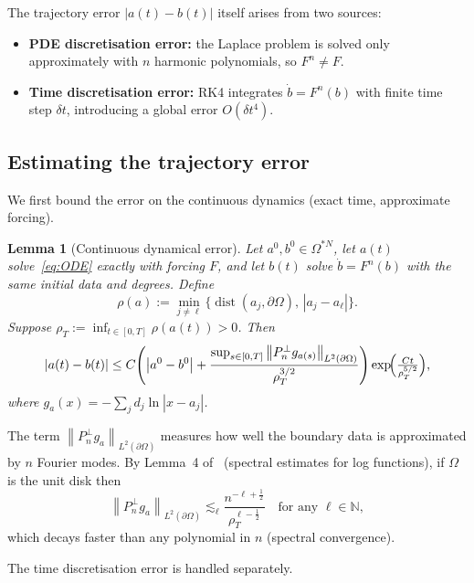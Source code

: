 \documentclass[12pt, a4paper]{article}
\theoremstyle{plain}
\newtheorem{lemma}[theorem]{Lemma}
\theoremstyle{definition}
\newcommand{\N}{\mathbb{N}}
\newcommand{\norm}[1]{\left\lVert #1 \right\rVert}
\newcommand{\abs}[1]{\left\lvert #1 \right\rvert}
\begin{document}
The trajectory error $\abs{a(t) - b(t)}$ itself arises from two sources:
\begin{itemize}
  \item \textbf{PDE discretisation error:} the Laplace problem is solved
        only approximately with $n$ harmonic polynomials, so $F^n \ne F$.
  \item \textbf{Time discretisation error:} RK4 integrates $\dot b = F^n(b)$
        with finite time step $\delta t$, introducing a global error $O(\delta t^4)$.
\end{itemize}

\subsection{Estimating the trajectory error}

We first bound the error on the continuous dynamics (exact time, approximate forcing).

\begin{lemma}[Continuous dynamical error]
  \label{lem:cont-error}
  Let $a^0, b^0 \in \Omega^{*N}$, let $a(t)$ solve~\eqref{eq:ODE}
  exactly with forcing $F$, and let $b(t)$ solve $\dot b = F^n(b)$
  with the same initial data and degrees.
  Define
  \[
    \rho(a) := \min_{j \ne \ell}\bigl\{\operatorname{dist}(a_j, \partial\Omega),\, \abs{a_j - a_\ell}\bigr\}.
  \]
  Suppose $\rho_T := \inf_{t \in [0,T]} \rho(a(t)) > 0$.
  Then
  \begin{align}
    \abs{a(t) - b(t)}
    \le C\!\left(
      \abs{a^0 - b^0}
      + \frac{\sup_{s \in [0,T]}
              \norm{P_n^\perp g_{a(s)}}_{L^2(\partial\Omega)}}{\rho_T^{3/2}}
    \right)
    \exp\!\Bigl(\tfrac{Ct}{\rho_T^{5/2}}\Bigr),
    \label{eq:cont-error}
  \end{align}
  where $g_a(x) = -\sum_j d_j\ln\abs{x - a_j}$.
\end{lemma}

The term $\norm{P_n^\perp g_a}_{L^2(\partial\Omega)}$ measures how well
the boundary data is approximated by $n$ Fourier modes.
By Lemma~4 of~\cite{CorsoKemlinMelcherStamm2024} (spectral estimates for log functions),
if $\Omega$ is the unit disk then
\[
  \norm{P_n^\perp g_a}_{L^2(\partial\Omega)}
  \lesssim_\ell \frac{n^{-\ell+\frac{1}{2}}}{\rho_T^{\ell-\frac{1}{2}}}
  \quad\text{for any } \ell \in \N,
\]
which decays faster than any polynomial in $n$ (spectral convergence).

The time discretisation error is handled separately.
\end{document}
